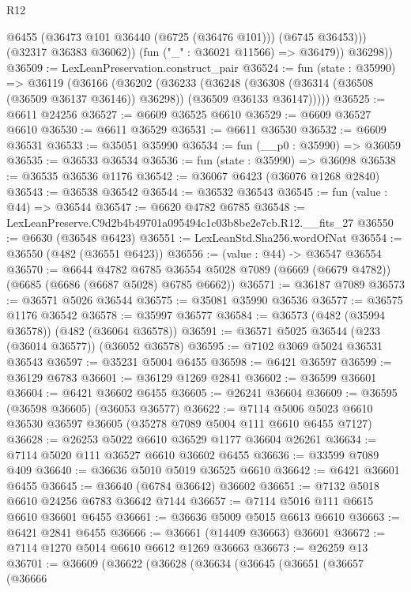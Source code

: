 \begin{lexlean}{R12}
\begin{coremodule}
                @6455
                (@36473 @101 @36440 (@6725 (@36476 @101)))
                (@6745 @36453)))
            (@32317 @36383 @36062))
          (fun ("_" : @36021 @11566) => @36479))
        @36298))
@36509 := LexLeanPreservation.construct_pair
@36524 := fun (state : @35990) =>
  @36119
    (@36166
      (@36202
        (@36233
          (@36248
            (@36308 (@36314 (@36508 (@36509 @36137 @36146)) @36298))
            (@36509 @36133 @36147)))))
@36525 := @6611 @24256
@36527 := @6609 @36525 @6610
@36529 := @6609 @36527 @6610
@36530 := @6611 @36529
@36531 := @6611 @36530
@36532 := @6609 @36531
@36533 := @35051 @35990
@36534 := fun (__p0 : @35990) => @36059
@36535 := @36533 @36534
@36536 := fun (state : @35990) => @36098
@36538 := @36535 @36536 @1176
@36542 := @36067 @6423 (@36076 @1268 @2840)
@36543 := @36538 @36542
@36544 := @36532 @36543
@36545 := fun (value : @44) => @36544
@36547 := @6620 @4782 @6785
@36548 := LexLeanPreserve.C9d2b4b49701a095494c1c03b8be2e7cb.R12.__fits_27
@36550 := @6630 (@36548 @6423)
@36551 := LexLeanStd.Sha256.wordOfNat
@36554 := @36550 (@482 (@36551 @6423))
@36556 := (value : @44) -> @36547 @36554
@36570 := @6644
    @4782
    @6785
    @36554
    @5028
    @7089
    (@6669 (@6679 @4782))
    (@6685 (@6686 (@6687 @5028) @6785 @6662))
@36571 := @36187 @7089
@36573 := @36571 @5026 @36544
@36575 := @35081 @35990 @36536
@36577 := @36575 @1176 @36542
@36578 := @35997 @36577
@36584 := @36573 (@482 (@35994 @36578)) (@482 (@36064 @36578))
@36591 := @36571 @5025 @36544 (@233 (@36014 @36577)) (@36052 @36578)
@36595 := @7102 @3069 @5024 @36531 @36543
@36597 := @35231 @5004 @6455
@36598 := @6421 @36597
@36599 := @36129 @6783
@36601 := @36129 @1269 @2841
@36602 := @36599 @36601
@36604 := @6421 @36602 @6455
@36605 := @26241 @36604
@36609 := @36595 (@36598 @36605) (@36053 @36577)
@36622 := @7114 @5006 @5023 @6610 @36530 @36597 @36605 (@35278 @7089 @5004 @111 @6610 @6455 @7127)
@36628 := @26253 @5022 @6610 @36529 @1177 @36604 @26261
@36634 := @7114 @5020 @111 @36527 @6610 @36602 @6455
@36636 := @33599 @7089 @409
@36640 := @36636 @5010 @5019 @36525 @6610
@36642 := @6421 @36601 @6455
@36645 := @36640 (@6784 @36642) @36602
@36651 := @7132 @5018 @6610 @24256 @6783 @36642 @7144
@36657 := @7114 @5016 @111 @6615 @6610 @36601 @6455
@36661 := @36636 @5009 @5015 @6613 @6610
@36663 := @6421 @2841 @6455
@36666 := @36661 (@14409 @36663) @36601
@36672 := @7114 @1270 @5014 @6610 @6612 @1269 @36663
@36673 := @26259 @13
@36701 := @36609
    (@36622
      (@36628
        (@36634
          (@36645
            (@36651
              (@36657
                (@36666

\end{coremodule}
\end{lexlean}
